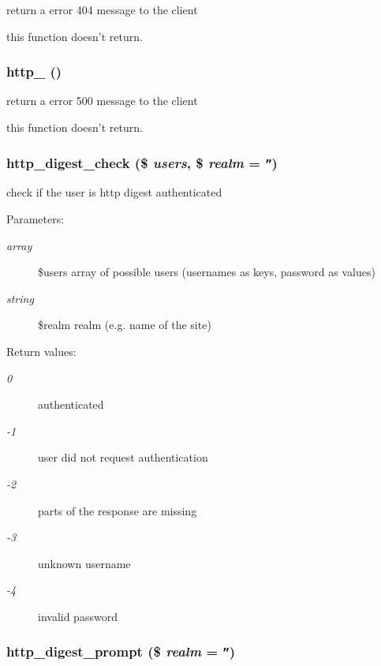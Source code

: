 return a error 404 message to the client

this function doesn't return. \hypertarget{util_8inc_8php_575cc91d803ae46bbc5dfaecbeb3561d}{
\subsubsection[{http\_\-500}]{\setlength{\rightskip}{0pt plus 5cm}http\_ ()}}
\label{util_8inc_8php_575cc91d803ae46bbc5dfaecbeb3561d}


return a error 500 message to the client

this function doesn't return. \hypertarget{util_8inc_8php_ff065fbc9f3abbf9c5a0ebfba22acbf7}{
\subsubsection[{http\_\-digest\_\-check}]{\setlength{\rightskip}{0pt plus 5cm}http\_\-digest\_\-check (\$ {\em users}, \/  \$ {\em realm} = {\tt ''})}}
\label{util_8inc_8php_ff065fbc9f3abbf9c5a0ebfba22acbf7}


check if the user is http digest authenticated

\begin{Desc}
\item[Parameters:]
\begin{description}
\item[{\em array}]\$users array of possible users (usernames as keys, password as values) \item[{\em string}]\$realm realm (e.g. name of the site) \end{description}
\end{Desc}
\begin{Desc}
\item[Return values:]
\begin{description}
\item[{\em 0}]authenticated \item[{\em -1}]user did not request authentication \item[{\em -2}]parts of the response are missing \item[{\em -3}]unknown username \item[{\em -4}]invalid password \end{description}
\end{Desc}
\hypertarget{util_8inc_8php_95d221746e2d296434b0d63f78cedf57}{
\subsubsection[{http\_\-digest\_\-prompt}]{\setlength{\rightskip}{0pt plus 5cm}http\_\-digest\_\-prompt (\$ {\em realm} = {\tt ''})}}
\label{util_8inc_8php_95d221746e2d296434b0d63f78cedf57}


